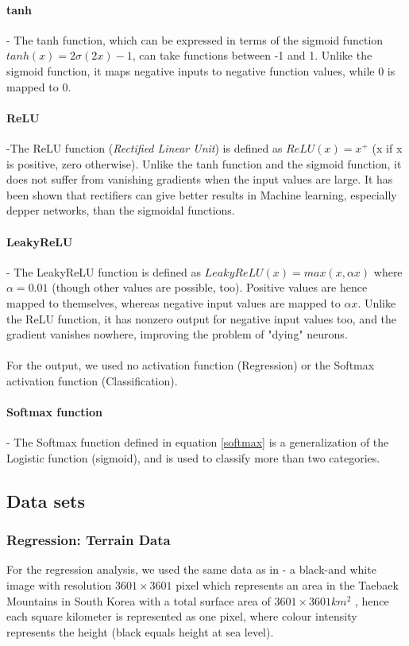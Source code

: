 \documentclass[11pt,a4paper,titlepage]{article}
\begin{document}
\paragraph*{tanh} - The tanh function, which can be expressed in terms of the sigmoid function $tanh(x)=2\sigma(2x)-1$, can take functions between -1 and 1. Unlike the sigmoid function, it maps negative inputs to negative function values, while 0 is mapped to 0.
\paragraph*{ReLU} -The ReLU function (\textit{Rectified Linear Unit}) is defined as $ReLU(x)=x^+$ (x if x is positive, zero otherwise). Unlike the tanh function and the sigmoid function, it does not suffer from vanishing gradients when the input values are large. It has been shown \citep{surpremeRELU} that rectifiers can give better results in Machine learning, especially depper networks, than the sigmoidal functions.
\paragraph*{LeakyReLU} - The LeakyReLU function is defined as $LeakyReLU(x)=max(x,\alpha x)$ where $\alpha=0.01$ (though other values are possible, too). Positive values are hence mapped to themselves, whereas negative input values are mapped to $\alpha x$. Unlike the ReLU function, it has nonzero output for negative input values too, and the gradient vanishes nowhere, improving the problem of "dying" neurons.\\\\
For the output, we used no activation function (Regression) or the Softmax activation function (Classification). 
\paragraph*{Softmax function} - The Softmax function defined in equation \eqref{softmax} is a generalization of the Logistic function (sigmoid), and is used to classify more than two categories.
\subsection{Data sets}
\subsubsection{Regression: Terrain Data}
For the regression analysis, we used the same data as in \citep{Project1} - a black-and white image with resolution $3601 \times 3601$ pixel which represents an area in the Taebaek Mountains in South Korea with a total surface area of $3601 \times 3601km^2$ , hence each square kilometer is represented as one pixel, where colour intensity represents the height (black equals height at sea level).
\end{document}
